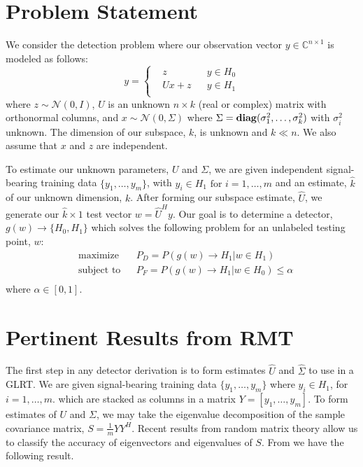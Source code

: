 \section{Problem Statement}\label{sec:prob}
We consider the detection problem where our observation vector $y \in \mathbb{C}^{n \times 1}$ is modeled as follows:
\begin{equation}\label{eq:prob state}
y=\left\{
\begin{aligned}
&z
&& y\in H_0\\
&Ux+z
&& y\in H_1\\
\end{aligned}\right.
\end{equation}
where $z\sim\mathcal{N}(0,I)$, $U$ is an unknown $n\times k$ (real or complex) matrix with orthonormal columns, and $x\sim\mathcal{N}(0,\Sigma)$ where $\Sigma=\mathop{\bf diag}(\sigma_1^2,\dots,\sigma_k^2)$ with $\sigma_i^2$ unknown. The dimension of our subspace, $k$, is unknown and $k\ll n$. We also assume that $x$ and $z$ are independent.

To estimate our unknown parameters, $U$ and $\Sigma$, we are given independent signal-bearing training data $\{y_1,\dots,y_m\}$, with $y_i\in H_1 \text{ for } i=1,\dots,m$ and an estimate, $\widehat{k}$ of our unknown dimension, $k$. After forming our subspace estimate, $\widehat{U}$,  we generate our $\widehat{k} \times 1$ test vector $w=\widehat{U}^Hy$. Our goal is to determine a detector, $g(w)\to\{H_0,H_1\}$ which solves the following problem for an unlabeled testing point, $w$:
\begin{equation}\label{eq:maximization}
\begin{aligned}
&\text{maximize}
&& P_D=P\left(g(w)\to H_1 | w\in H_1\right)\\
&\text{subject to}
&& P_F=P\left(g(w)\to H_1 | w\in H_0\right)\leq\alpha\\
\end{aligned}
\end{equation}
where $\alpha\in[0,1]$.

\section{Pertinent Results from RMT}\label{sec:params}
The first step in any detector derivation is to form estimates $\widehat{U}$ and $\widehat{\Sigma}$ to use in a GLRT. We are given signal-bearing training data $\{y_1,\dots,y_m\}$ where $y_i\in H_1$, for $i=1,\dots,m$. which are stacked as columns in a matrix $Y=[y_1,\dots,y_m]$. To form estimates of $U$ and $\Sigma$, we may take the eigenvalue decomposition of the sample covariance matrix, $S=\frac{1}{m}YY^H$. Recent results from random matrix theory allow us to classify the accuracy of eigenvectors and eigenvalues of $S$. From \cite{paul2007asymptotics,asendorf,benaych2011eigenvalues} we have the following result.

